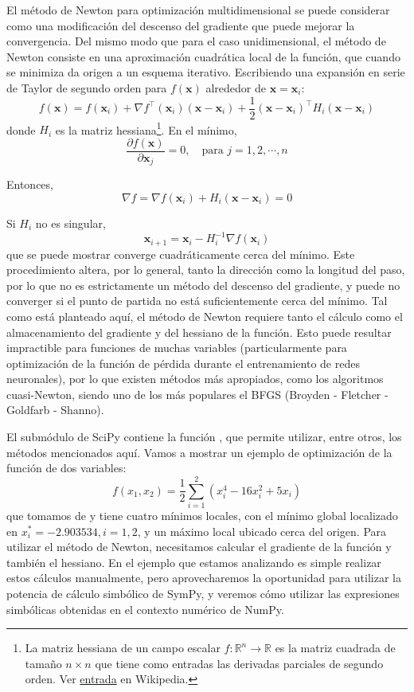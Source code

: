 El método de Newton para optimización multidimensional se puede considerar como una modificación del descenso del gradiente que puede mejorar la convergencia. Del mismo modo que para el caso unidimensional, el método de Newton consiste en una aproximación cuadrática local de la función, que cuando se minimiza da origen a un esquema iterativo. Escribiendo una expansión en serie de Taylor de segundo orden para $f(\bm{x})$ alrededor de $\bm{x} = \bm{x}_i$:
\[ f(\bm{x}) = f(\bm{x}_i) + \nabla f^{\intercal}(\bm{x}_i)(\bm{x} - \bm{x}_i) + \frac{1}{2}(\bm{x} - \bm{x}_i)^{\intercal} H_i(\bm{x} - \bm{x}_i) \]
donde $H_i$ es la matriz hessiana\footnote{La matriz hessiana de un campo escalar $f : \mathbb{R}^n \rightarrow \mathbb{R}$ es la matriz cuadrada de tamaño $n \times n$ que tiene como entradas las derivadas parciales de segundo orden. Ver \href{https://es.wikipedia.org/wiki/Matriz_hessiana}{entrada} en Wikipedia.}. En el mínimo, 
\[ \frac{\partial f(\bm{x})}{\partial \bm{x}_j} = 0, \quad \text{para } j = 1, 2, \cdots, n \]

Entonces, 
\[ \nabla f = \nabla f(\bm{x}_i) + H_i(\bm{x} - \bm{x}_i) = 0 \]

Si $H_i$ no es singular,
\[ \bm{x}_{i+1} = \bm{x}_i - H_i^{-1} \nabla f(\bm{x}_i) \]
que se puede mostrar converge cuadráticamente cerca del mínimo. Este procedimiento altera, por lo general, tanto la dirección como la longitud del paso, por lo que no es estrictamente un método del descenso del gradiente, y puede no converger si el punto de partida no está suficientemente cerca del mínimo. Tal como está planteado aquí, el método de Newton requiere tanto el cálculo como el almacenamiento del gradiente y del hessiano de la función. Esto puede resultar impractible para funciones de muchas variables (particularmente para optimización de la función de pérdida durante el entrenamiento de redes neuronales), por lo que existen métodos más apropiados, como los algoritmos cuasi-Newton, siendo uno de los más populares el BFGS (Broyden - Fletcher - Goldfarb - Shanno).

El submódulo  de SciPy contiene la función , que permite utilizar, entre otros, los métodos mencionados aquí. Vamos a mostrar un ejemplo de optimización de la función de dos variables:
\[ f(x_1, x_2) = \frac{1}{2} \sum_{i=1}^2 (x_i^4 - 16 x_i^2 + 5 x_i) \]
que tomamos de \citeauthor{styblinski1990} \cite{styblinski1990} y tiene cuatro mínimos locales, con el mínimo global localizado en $x_i^* = -2.903534, i= 1, 2$, y un máximo local ubicado cerca del origen. Para utilizar el método de Newton, necesitamos calcular el gradiente de la función y también el hessiano. En el ejemplo que estamos analizando es simple realizar estos cálculos manualmente, pero aprovecharemos la oportunidad para utilizar la potencia de cálculo simbólico de SymPy, y veremos cómo utilizar las expresiones simbólicas obtenidas en el contexto numérico de NumPy. 

